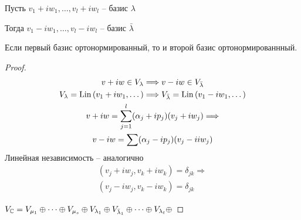 \begin{lemma} \quad

    Пусть $v_1 + i w_1, \dots, v_l + i w_l$ -- базис $\lambda$
    
    Тогда $v_1 - i w_1, \dots, v_l - i w_l$ -- базис $\bar \lambda$

    Если первый базис ортонормированный, то и второй базис ортонормированнный. 
\end{lemma}
\begin{proof}
    \begin{gather*}
        v + iw \in V_\lambda \Longrightarrow v - iw \in V_{\bar \lambda} \\
        V_\lambda = \operatorname{Lin}{(v_1 + i w_1, \dots)} \Longrightarrow V_{\bar \lambda} = \operatorname{Lin}{(v_1 - i w_1, \dots)} \\
        v + iw = \sum_{j = 1}^l (\alpha_j + i p_j)(v_j + i w_j) \Longrightarrow \\
        v - iw = \sum(\alpha_j - i p_j) (v_j - i i w_j)
    \end{gather*}
    Линейная независимость -- аналогично
    \begin{gather*}
        (v_j + i w_j, v_k + i w_k) = \delta_{jk} \Longrightarrow \\
        (v_j - i w_j, v_k - i w_k) = \delta_{jk}
    \end{gather*}

    $V_{\mathbb{C}} = V_{\mu_1} \oplus \dots \oplus V_{\mu_s} \oplus V_{\lambda_1} \oplus V_{\bar \lambda_1} \oplus \dots \oplus V_{\lambda_t} \oplus $
\end{proof}

